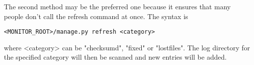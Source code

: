 The second method may be the preferred one because it ensures that many people don't call the refresh command at once. The syntax is

{\tt <MONITOR\_ROOT>/manage.py refresh <category>} 

where <category> can be "checksumd", "fixed" or "lostfiles". The log directory for the specified category will then be scanned and new entries will be added.
